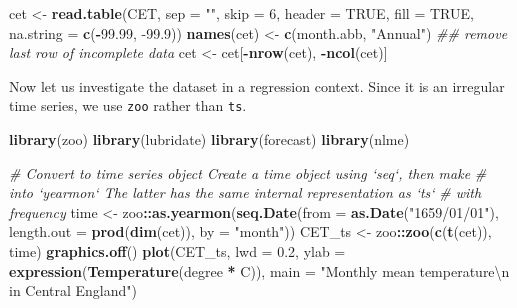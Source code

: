 \documentclass[]{book}
\newenvironment{Shaded}{\begin{snugshade}}{\end{snugshade}}
\newcommand{\CharTok}[1]{\textcolor[rgb]{0.31,0.60,0.02}{#1}}
\newcommand{\CommentTok}[1]{\textcolor[rgb]{0.56,0.35,0.01}{\textit{#1}}}
\newcommand{\DataTypeTok}[1]{\textcolor[rgb]{0.13,0.29,0.53}{#1}}
\newcommand{\DecValTok}[1]{\textcolor[rgb]{0.00,0.00,0.81}{#1}}
\newcommand{\FloatTok}[1]{\textcolor[rgb]{0.00,0.00,0.81}{#1}}
\newcommand{\KeywordTok}[1]{\textcolor[rgb]{0.13,0.29,0.53}{\textbf{#1}}}
\newcommand{\NormalTok}[1]{#1}
\newcommand{\OperatorTok}[1]{\textcolor[rgb]{0.81,0.36,0.00}{\textbf{#1}}}
\newcommand{\OtherTok}[1]{\textcolor[rgb]{0.56,0.35,0.01}{#1}}
\newcommand{\StringTok}[1]{\textcolor[rgb]{0.31,0.60,0.02}{#1}}
\begin{document}
\begin{Shaded}
\begin{Highlighting}[]
\NormalTok{cet <-}\StringTok{ }\KeywordTok{read.table}\NormalTok{(CET, }\DataTypeTok{sep =} \StringTok{""}\NormalTok{, }\DataTypeTok{skip =} \DecValTok{6}\NormalTok{, }\DataTypeTok{header =} \OtherTok{TRUE}\NormalTok{, }\DataTypeTok{fill =} \OtherTok{TRUE}\NormalTok{, }\DataTypeTok{na.string =} \KeywordTok{c}\NormalTok{(}\OperatorTok{-}\FloatTok{99.99}\NormalTok{, }
    \FloatTok{-99.9}\NormalTok{))}
\KeywordTok{names}\NormalTok{(cet) <-}\StringTok{ }\KeywordTok{c}\NormalTok{(month.abb, }\StringTok{"Annual"}\NormalTok{)}
\CommentTok{## remove last row of incomplete data}
\NormalTok{cet <-}\StringTok{ }\NormalTok{cet[}\OperatorTok{-}\KeywordTok{nrow}\NormalTok{(cet), }\OperatorTok{-}\KeywordTok{ncol}\NormalTok{(cet)]}
\end{Highlighting}
\end{Shaded}

Now let us investigate the dataset in a regression context. Since it is
an irregular time series, we use \texttt{zoo} rather than \texttt{ts}.

\begin{Shaded}
\begin{Highlighting}[]
\KeywordTok{library}\NormalTok{(zoo)}
\KeywordTok{library}\NormalTok{(lubridate)}
\KeywordTok{library}\NormalTok{(forecast)}
\KeywordTok{library}\NormalTok{(nlme)}
\end{Highlighting}
\end{Shaded}

\begin{Shaded}
\begin{Highlighting}[]
\CommentTok{# Convert to time series object Create a time object using `seq`, then make}
\CommentTok{# into `yearmon` The latter has the same internal representation as `ts`}
\CommentTok{# with frequency}
\NormalTok{time <-}\StringTok{ }\NormalTok{zoo}\OperatorTok{::}\KeywordTok{as.yearmon}\NormalTok{(}\KeywordTok{seq.Date}\NormalTok{(}\DataTypeTok{from =} \KeywordTok{as.Date}\NormalTok{(}\StringTok{"1659/01/01"}\NormalTok{), }\DataTypeTok{length.out =} \KeywordTok{prod}\NormalTok{(}\KeywordTok{dim}\NormalTok{(cet)), }
    \DataTypeTok{by =} \StringTok{"month"}\NormalTok{))}
\NormalTok{CET_ts <-}\StringTok{ }\NormalTok{zoo}\OperatorTok{::}\KeywordTok{zoo}\NormalTok{(}\KeywordTok{c}\NormalTok{(}\KeywordTok{t}\NormalTok{(cet)), time)}
\KeywordTok{graphics.off}\NormalTok{()}
\KeywordTok{plot}\NormalTok{(CET_ts, }\DataTypeTok{lwd =} \FloatTok{0.2}\NormalTok{, }\DataTypeTok{ylab =} \KeywordTok{expression}\NormalTok{(}\KeywordTok{Temperature}\NormalTok{(degree }\OperatorTok{*}\StringTok{ }\NormalTok{C)), }\DataTypeTok{main =} \StringTok{"Monthly mean temperature}\CharTok{\textbackslash{}n}\StringTok{ in Central England"}\NormalTok{)}
\end{Highlighting}
\end{Shaded}
\end{document}
